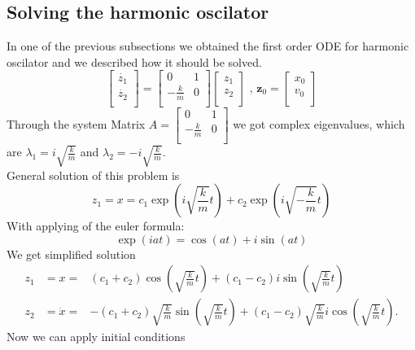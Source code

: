 \subsection{Solving the harmonic oscilator}
In one of the previous subsections we obtained the first order ODE for harmonic oscilator and we described how it should be solved.
\begin{equation}
	\begin{bmatrix}
		\dot{z_1}\\
		\dot{z_2}\\
	\end{bmatrix} = \begin{bmatrix}
		0 & 1\\
		-\frac{k}{m} & 0\\
	\end{bmatrix}
	\begin{bmatrix}
		z_1\\
		z_2\\
	\end{bmatrix}\text{   , }\mathbf{z}_0 = \begin{bmatrix}
x_0\\
v_0\\
\end{bmatrix}
\end{equation}
Through the system Matrix $A = \begin{bmatrix}
	0 & 1\\
	-\frac{k}{m} & 0\\
\end{bmatrix}$ we got complex eigenvalues, which are $\lambda_1 = i\sqrt{\frac{k}{m}}$ and $\lambda_2 = -i\sqrt{\frac{k}{m}}$.\\
General solution of this problem is
\begin{equation}
	z_1 = x = c_1\exp(i\sqrt{\frac{k}{m}}t) + c_2\exp(i\sqrt{-\frac{k}{m}}t)
\end{equation}
With applying of the euler formula:
\begin{equation}
	\exp(iat)=\cos(at) + i\sin(at)
\end{equation}
We get simplified solution
\begin{eqnarray}
	z_1 &= x =& (c_1+c_2)\cos\left(\sqrt{\frac{k}{m}}t\right) + (c_1-c_2)i\sin\left(\sqrt{\frac{k}{m}}t\right)\\
	z_2 &= \dot{x} =& -(c_1+c_2)\sqrt{\frac{k}{m}}\sin\left(\sqrt{\frac{k}{m}}t\right)+(c_1-c_2)\sqrt{\frac{k}{m}}i\cos\left(\sqrt{\frac{k}{m}}t\right).
\end{eqnarray}
Now we can apply initial conditions
